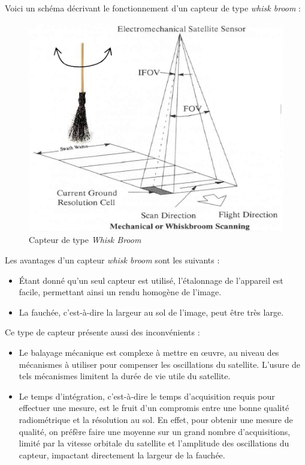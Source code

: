 \documentclass[a4paper, 11pt]{report}
\begin{document}
Voici un schéma décrivant le fonctionnement d'un capteur de type \emph{whisk broom} \citep{Hillen2009a}:
\begin{figure}[H]
	\centering
	\includegraphics[scale=0.5]{Images/Whisk_Broom.jpg}
	\caption{Capteur de type \emph{Whisk Broom}}
\end{figure}
Les avantages d'un capteur \emph{whisk broom} sont les suivants :
\begin{itemize}
	\item Étant donné qu'un seul capteur est utilisé, l'étalonnage de l'appareil est facile, permettant ainsi un rendu homogène de l'image.
	\item La fauchée, c'est-à-dire la largeur au sol de l'image, peut être très large.
\end{itemize}
Ce type de capteur présente aussi des inconvénients :
\begin{itemize}
	\item Le balayage mécanique est complexe à mettre en œuvre, au niveau des mécanismes à utiliser pour compenser les oscillations du satellite. L'usure de tels mécanismes limitent la durée de vie utile du satellite.
	\item Le temps d'intégration, c'est-à-dire le temps d'acquisition requis pour effectuer une mesure, est le fruit d'un compromis entre une bonne qualité radiométrique et la résolution au sol. En effet, pour obtenir une mesure de qualité, on préfère faire une moyenne sur un grand nombre d'acquisitions, limité par la vitesse orbitale du satellite et l'amplitude des oscillations du capteur, impactant directement la largeur de la fauchée.
\end{itemize}
\end{document}
